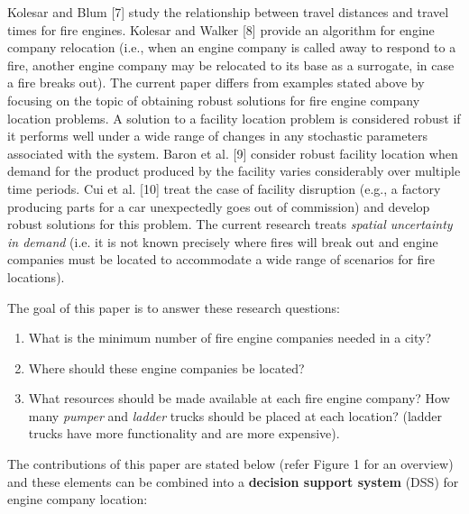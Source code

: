 \documentclass{article} %
\begin{document}
\noindent Kolesar and Blum [7] study the relationship between travel distances and travel times for fire engines.  Kolesar and Walker [8] provide an algorithm for engine company relocation\textit{ }(i.e., when an engine company is called away to respond to a fire, another engine company may be relocated to its base as a surrogate, in case a fire breaks out).  The current paper differs from examples stated above by focusing on the topic of obtaining robust solutions for fire engine company location problems.  A solution to a facility location problem is considered robust if it performs well under a wide range of changes in any stochastic parameters associated with the system.   Baron et al. [9] consider robust facility location when demand for the product produced by the facility varies considerably over multiple time periods.  Cui et al. [10] treat the case of facility disruption (e.g., a factory producing parts for a car unexpectedly goes out of commission) and develop robust solutions for this problem.  The current research treats \textit{spatial uncertainty in demand} (i.e. it is not known precisely where fires will break out and engine companies must be located to accommodate a wide range of scenarios for fire locations).

\noindent 

\noindent The goal of this paper is to answer these research questions:

\begin{enumerate}
\item  What is the minimum number of fire engine companies needed in a city?

\item  Where should these engine companies be located?

\item  What resources should be made available at each fire engine company?  How many \textit{pumper} and \textit{ladder} trucks should be placed at each location? (ladder trucks have more functionality and are more expensive).
\end{enumerate}

\noindent 

\noindent The contributions of this paper are stated below (refer Figure 1 for an overview) and these elements can be combined into a \textbf{decision support system} (DSS) for engine company location:
\end{document}

